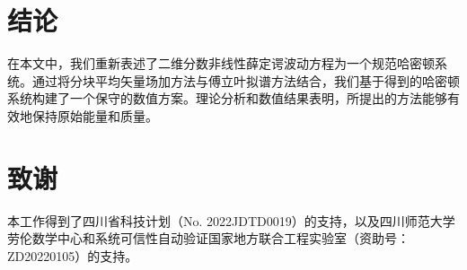 			\section{结论}\label{Section_PAVF: 5}

			在本文中，我们重新表述了二维分数非线性薛定谔波动方程为一个规范哈密顿系统。通过将分块平均矢量场加方法与傅立叶拟谱方法结合，我们基于得到的哈密顿系统构建了一个保守的数值方案。理论分析和数值结果表明，所提出的方法能够有效地保持原始能量和质量。
			
			\section*{致谢}
			
			本工作得到了四川省科技计划（No. 2022JDTD0019）的支持，以及四川师范大学劳伦数学中心和系统可信性自动验证国家地方联合工程实验室（资助号：ZD20220105）的支持。
				